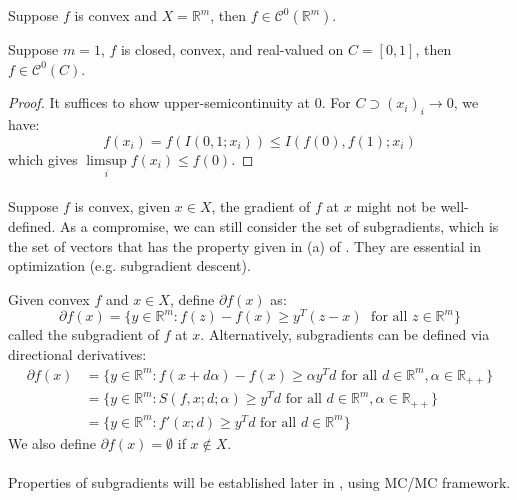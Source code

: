 \begin{coro}
	\label{coro:022-continuity-real-valued}
	Suppose $f$ is convex and $X=\mathbb{R}^m$, then $f\in \mathscr{C}^0(\mathbb{R}^m)$.
\end{coro}

\begin{coro}
	\label{coro:022-line-continuity}
	Suppose $m=1$, $f$ is closed, convex, and real-valued on $C=[0,1]$, then $f\in \mathscr{C}^0(C)$.
\end{coro}

\begin{proof}
	It suffices to show upper-semicontinuity at $0$. For $C\supset (x_i)_i\to 0$, we have:
	\[
		f(x_i)=f(I(0,1;x_i))\leq I(f(0),f(1); x_i)
	\]
	which gives $\underset{i}{\operatorname{limsup}}f(x_i)\leq f(0)$.
\end{proof}

\paragraph{}Suppose $f$ is convex, given $x\in X$, the gradient of $f$ at $x$ might not be well-defined. As a compromise, we can still consider the set of subgradients, which is the set of vectors that has the property given in (a) of . They are essential in optimization (e.g. subgradient descent).

\begin{defn}[Subgradients]\label{defn:022-subgradients}
	Given convex $f$ and $x\in X$, define $\partial f(x)$ as:
	\[
		\partial f(x) = \{
		y\in \mathbb{R}^m: f(z) - f(x) \geq y^T(z- x)\;\text{ for all }z\in \mathbb{R}^m
		\}
	\]
	called the subgradient of $f$ at $x$. Alternatively, subgradients can be defined via directional derivatives:
	\begin{align*}
		\partial f(x) & = \{y\in \mathbb{R}^m: f(x+d \alpha )-f(x) \geq \alpha y^Td \text{ for all }d \in \mathbb{R}^m, \alpha\in \mathbb{R}_{++} \} \\
		              & = \{y\in \mathbb{R}^m: S(f,x; d; \alpha) \geq y^Td \text{ for all }d \in \mathbb{R}^m, \alpha\in \mathbb{R}_{++} \}          \\
		              & = \{y\in \mathbb{R}^m: f'(x; d) \geq y^T d \text{ for all }d \in \mathbb{R}^m \}
	\end{align*}
	We also define $\partial f(x)=\emptyset$ if $x\notin X$.
\end{defn}

\paragraph{}Properties of subgradients will be established later in , using MC/MC framework.

